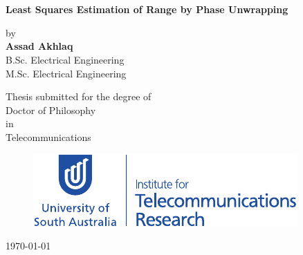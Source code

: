 \newcommand{\doctitle}{Least Squares Estimation  of Range by Phase Unwrapping }

\begin{center}

  \huge{~\\~\\}

  \huge{\bf\doctitle}\\

  \vspace{12mm}

\Large{by}\\
  \vspace{12mm}
  {\huge{\bf{Assad Akhlaq}}}\\
  {\Large B.Sc. Electrical Engineering} \\
  {\Large M.Sc. Electrical Engineering } 


  \vspace{20mm}
  \Large{Thesis submitted for the degree of\\
    Doctor of Philosophy\\ in \\Telecommunications}
\vspace{20 mm}
  \Large{~\\}

  \begin{figure} [h]
    \centering
      \includegraphics[width=0.80\columnwidth]{InstTelecomRsch_01.pdf}
  \end{figure}


  \vspace{20mm}

  \Large{\today}  %

\end{center}

